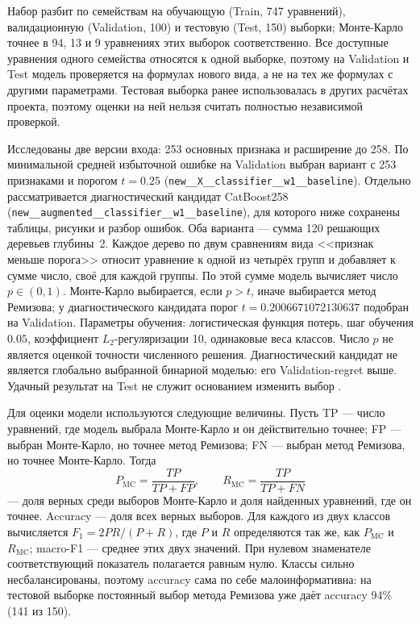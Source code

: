 \documentclass[14pt,a4paper]{extarticle}
\newcommand{\code}[1]{\texttt{#1}}
\begin{document}
Набор разбит по семействам на обучающую (Train, 747 уравнений),
валидационную (Validation, 100) и тестовую (Test, 150) выборки;
Монте-Карло точнее в 94, 13 и 9 уравнениях этих выборок соответственно.
Все доступные уравнения одного семейства относятся к одной выборке, поэтому
на Validation и Test модель проверяется на формулах нового вида,
а не на тех же формулах с другими параметрами. Тестовая выборка ранее
использовалась в других расчётах проекта, поэтому оценки на ней нельзя
считать полностью независимой проверкой.

Исследованы две версии входа: 253 основных признака и расширение
до 258. По минимальной средней избыточной ошибке на Validation
выбран вариант с 253 признаками и порогом $t=0.25$
(\code{new\_\_X\_\_classifier\_\_w1\_\_baseline}).
Отдельно рассматривается диагностический кандидат CatBoost258
(\code{new\_\_augmented\_\_classifier\_\_w1\_\_baseline}),
для которого ниже сохранены таблицы, рисунки и разбор ошибок.
Оба варианта --- сумма 120 решающих деревьев глубины~2.
Каждое дерево по двум сравнениям вида <<признак меньше порога>> относит
уравнение к одной из четырёх групп и добавляет к сумме число, своё
для каждой группы. По этой сумме модель вычисляет число $p\in(0,1)$.
Монте-Карло выбирается, если $p>t$, иначе выбирается метод Ремизова;
у диагностического кандидата порог
$t=0.2006671072130637$ подобран на Validation. Параметры обучения:
логистическая функция потерь, шаг обучения $0.05$, коэффициент
$L_2$-регуляризации 10, одинаковые веса классов. Число $p$ не является
оценкой точности численного решения. Диагностический кандидат
не является глобально выбранной бинарной моделью: его Validation-regret
выше. Удачный результат на Test не служит основанием изменить выбор
\cite{savedmodels}.

Для оценки модели используются следующие величины. Пусть TP --- число
уравнений, где модель выбрала Монте-Карло и он действительно точнее;
FP --- выбран Монте-Карло, но точнее метод Ремизова; FN --- выбран метод
Ремизова, но точнее Монте-Карло. Тогда
\[
P_{\mathrm{MC}}=\frac{TP}{TP+FP},\qquad R_{\mathrm{MC}}=\frac{TP}{TP+FN}
\]
--- доля верных среди выборов Монте-Карло и доля найденных уравнений,
где он точнее. Accuracy --- доля всех верных выборов. Для каждого
из двух классов вычисляется $F_1=2PR/(P+R)$, где $P$ и $R$ определяются
так же, как $P_{\mathrm{MC}}$ и $R_{\mathrm{MC}}$; macro-F1 --- среднее
этих двух значений. При нулевом знаменателе соответствующий
показатель полагается равным нулю. Классы сильно несбалансированы,
поэтому accuracy
сама по себе малоинформативна: на тестовой выборке постоянный выбор
метода Ремизова уже даёт accuracy 94\% (141 из 150).
\end{document}
